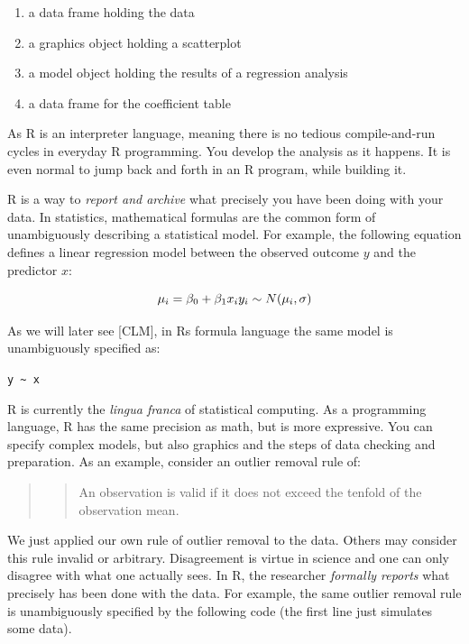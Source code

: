 \documentclass[]{svmono}
\providecommand{\tightlist}{%
  \setlength{\itemsep}{0pt}\setlength{\parskip}{0pt}}
\begin{document}
\begin{enumerate}
\def\labelenumi{\arabic{enumi}.}
\tightlist
\item
  a data frame holding the data
\item
  a graphics object holding a scatterplot
\item
  a model object holding the results of a regression analysis
\item
  a data frame for the coefficient table
\end{enumerate}

As R is an interpreter language, meaning there is no tedious
compile-and-run cycles in everyday R programming. You develop the
analysis as it happens. It is even normal to jump back and forth in an R
program, while building it.

R is a way to \emph{report and archive} what precisely you have been
doing with your data. In statistics, mathematical formulas are the
common form of unambiguously describing a statistical model. For
example, the following equation defines a linear regression model
between the observed outcome \(y\) and the predictor \(x\):

\[
\mu_i = \beta_0 +  \beta_1x_i\\
y_i \sim N(\mu_i, \sigma)
\]

As we will later see {[}CLM{]}, in Rs formula language the same model is
unambiguously specified as:

\texttt{y\ \textasciitilde{}\ x}

R is currently the \emph{lingua franca} of statistical computing. As a
programming language, R has the same precision as math, but is more
expressive. You can specify complex models, but also graphics and the
steps of data checking and preparation. As an example, consider an
outlier removal rule of:

\begin{quote}
\begin{quote}
An observation is valid if it does not exceed the tenfold of the
observation mean.
\end{quote}
\end{quote}

We just applied our own rule of outlier removal to the data. Others may
consider this rule invalid or arbitrary. Disagreement is virtue in
science and one can only disagree with what one actually sees. In R, the
researcher \emph{formally reports} what precisely has been done with the
data. For example, the same outlier removal rule is unambiguously
specified by the following code (the first line just simulates some
data).
\end{document}
